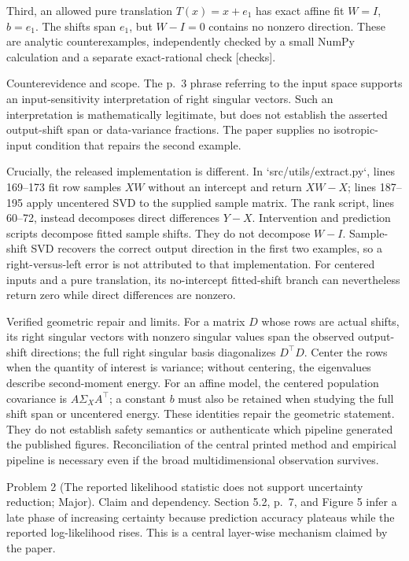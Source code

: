 \documentclass[10pt]{article}
\begin{document}
Third, an allowed pure translation \(T(x)=x+e_1\) has exact affine fit \(W=I\), \(b=e_1\). The shifts span \(e_1\), but \(W-I=0\) contains no nonzero direction. These are analytic counterexamples, independently checked by a small NumPy calculation and a separate exact-rational check [checks].\par
Counterevidence and scope. The p. 3 phrase referring to the input space supports an input-sensitivity interpretation of right singular vectors. Such an interpretation is mathematically legitimate, but does not establish the asserted output-shift span or data-variance fractions. The paper supplies no isotropic-input condition that repairs the second example.\par
Crucially, the released implementation is different. In `src/utils/extract.py`, lines 169–173 fit row samples \(XW\) without an intercept and return \(XW-X\); lines 187–195 apply uncentered SVD to the supplied sample matrix. The rank script, lines 60–72, instead decomposes direct differences \(Y-X\). Intervention and prediction scripts decompose fitted sample shifts. They do not decompose \(W-I\). Sample-shift SVD recovers the correct output direction in the first two examples, so a right-versus-left error is not attributed to that implementation. For centered inputs and a pure translation, its no-intercept fitted-shift branch can nevertheless return zero while direct differences are nonzero.\par
Verified geometric repair and limits. For a matrix \(D\) whose rows are actual shifts, its right singular vectors with nonzero singular values span the observed output-shift directions; the full right singular basis diagonalizes \(D^\top D\). Center the rows when the quantity of interest is variance; without centering, the eigenvalues describe second-moment energy. For an affine model, the centered population covariance is \(A\Sigma_X A^\top\); a constant \(b\) must also be retained when studying the full shift span or uncentered energy. These identities repair the geometric statement. They do not establish safety semantics or authenticate which pipeline generated the published figures. Reconciliation of the central printed method and empirical pipeline is necessary even if the broad multidimensional observation survives.\par
Problem 2 (The reported likelihood statistic does not support uncertainty reduction; Major).  Claim and dependency. Section 5.2, p. 7, and Figure 5 infer a late phase of increasing certainty because prediction accuracy plateaus while the reported log-likelihood rises. This is a central layer-wise mechanism claimed by the paper.\par
\end{document}
